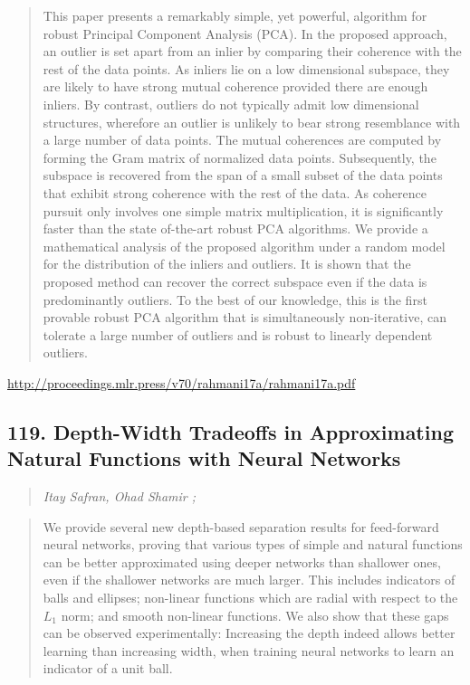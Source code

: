 \documentclass{article}
\begin{document}
\begin{quote}
    This paper presents a remarkably simple, yet powerful, algorithm for robust Principal Component Analysis (PCA). In the proposed approach, an outlier is set apart from an inlier by comparing their coherence with the rest of the data points. As inliers lie on a low dimensional subspace, they are likely to have strong mutual coherence provided there are enough inliers. By contrast, outliers do not typically admit low dimensional structures, wherefore an outlier is unlikely to bear strong resemblance with a large number of data points. The mutual coherences are computed by forming the Gram matrix of normalized data points. Subsequently, the subspace is recovered from the span of a small subset of the data points that exhibit strong coherence with the rest of the data. As coherence pursuit only involves one simple matrix multiplication, it is significantly faster than the state of-the-art robust PCA algorithms. We provide a mathematical analysis of the proposed algorithm under a random model for the distribution of the inliers and outliers. It is shown that the proposed method can recover the correct subspace even if the data is predominantly outliers. To the best of our knowledge, this is the first provable robust PCA algorithm that is simultaneously non-iterative, can tolerate a large number of outliers and is robust to linearly dependent outliers.  \end{quote}

\href{http://proceedings.mlr.press/v70/rahmani17a/rahmani17a.pdf}{http://proceedings.mlr.press/v70/rahmani17a/rahmani17a.pdf}

\subsection{119. Depth-Width Tradeoffs in Approximating Natural Functions with Neural Networks}

\begin{quote}
\footnotesize{\textit{Itay Safran, Ohad Shamir ;}}
\end{quote}

\begin{quote}
    We provide several new depth-based separation results for feed-forward neural networks, proving that various types of simple and natural functions can be better approximated using deeper networks than shallower ones, even if the shallower networks are much larger. This includes indicators of balls and ellipses; non-linear functions which are radial with respect to the $L_1$ norm; and smooth non-linear functions. We also show that these gaps can be observed experimentally: Increasing the depth indeed allows better learning than increasing width, when training neural networks to learn an indicator of a unit ball.  \end{quote}
\end{document}
